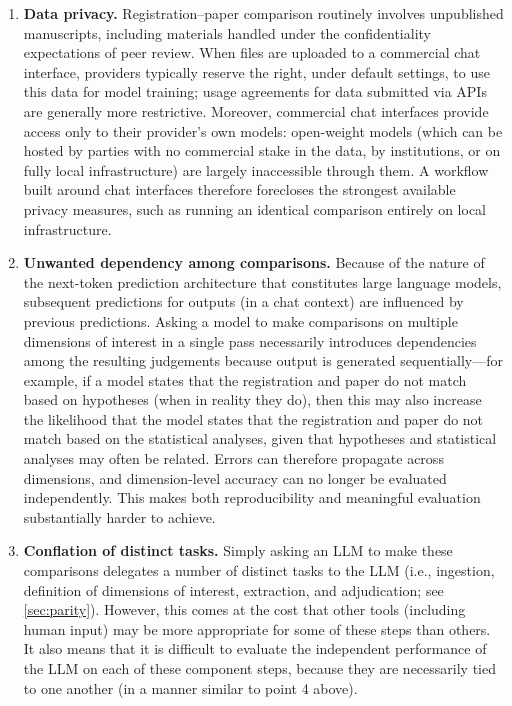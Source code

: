 \documentclass{article}
\begin{document}
\begin{enumerate}
  \item \textbf{Data privacy.} Registration--paper comparison routinely involves
  unpublished manuscripts, including materials handled under the confidentiality
  expectations of peer review. When files are uploaded to a commercial chat
  interface, providers typically reserve the right, under default settings, to
  use this data for model training; usage agreements for data submitted via APIs
  are generally more restrictive. Moreover, commercial chat interfaces provide
  access only to their provider's own models: open-weight models (which can be
  hosted by parties with no commercial stake in the data, by institutions, or on
  fully local infrastructure) are largely inaccessible through them. A workflow
  built around chat interfaces therefore forecloses the strongest available
  privacy measures, such as running an identical comparison entirely on local
  infrastructure.

  \item \textbf{Unwanted dependency among comparisons.} Because of the nature of
  the next-token prediction architecture that constitutes large language models,
  subsequent predictions for outputs (in a chat context) are influenced by
  previous predictions. Asking a model to make comparisons on multiple
  dimensions of interest in a single pass necessarily introduces dependencies
  among the resulting judgements because output is generated sequentially---for
  example, if a model states that the registration and paper do not match based
  on hypotheses (when in reality they do), then this may also increase the
  likelihood that the model states that the registration and paper do not match
  based on the statistical analyses, given that hypotheses and statistical
  analyses may often be related. Errors can therefore propagate across
  dimensions, and dimension-level accuracy can no longer be evaluated
  independently. This makes both reproducibility and meaningful evaluation
  substantially harder to achieve.

  \item \textbf{Conflation of distinct tasks.} Simply asking an LLM to make
  these comparisons delegates a number of distinct tasks to the LLM (i.e.,
  ingestion, definition of dimensions of interest, extraction, and adjudication;
  see \cref{sec:parity}). However, this comes at the cost that other tools
  (including human input) may be more appropriate for some of these steps than
  others. It also means that it is difficult to evaluate the independent
  performance of the LLM on each of these component steps, because they are
  necessarily tied to one another (in a manner similar to point 4 above).


\end{enumerate}
\end{document}
